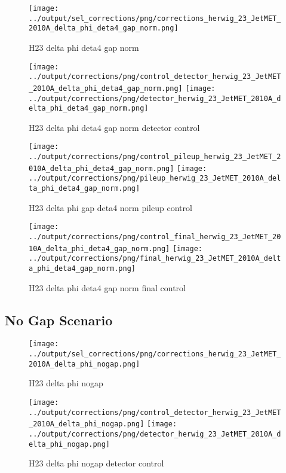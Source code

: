 \documentclass[11pt]{book}
\begin{document}
\begin{figure}[ht]
\centering
\texttt{[image: ../output/sel\_corrections/png/corrections\_herwig\_23\_JetMET\_2010A\_delta\_phi\_deta4\_gap\_norm.png]}
\caption{H23 delta phi deta4 gap norm}
\label{fig:H23_JetMET_2010A_delta_phi_deta4_gap_norm}
\end{figure}


\begin{figure}[ht]
\centering
\texttt{[image: ../output/corrections/png/control\_detector\_herwig\_23\_JetMET\_2010A\_delta\_phi\_deta4\_gap\_norm.png]}
\texttt{[image: ../output/corrections/png/detector\_herwig\_23\_JetMET\_2010A\_delta\_phi\_deta4\_gap\_norm.png]}
\caption{H23 delta phi deta4 gap norm detector control}
\label{fig:H23_JetMET_2010A_delta_phi_deta4_gap_norm_detector_control}
\end{figure}

\begin{figure}[ht]
\centering
\texttt{[image: ../output/corrections/png/control\_pileup\_herwig\_23\_JetMET\_2010A\_delta\_phi\_deta4\_gap\_norm.png]}
\texttt{[image: ../output/corrections/png/pileup\_herwig\_23\_JetMET\_2010A\_delta\_phi\_deta4\_gap\_norm.png]}
\caption{H23 delta phi gap deta4 norm pileup control}
\label{fig:H23_JetMET_2010A_delta_phi_deta4_gap_norm_pileup_control}
\end{figure}


\begin{figure}[ht]
\centering
\texttt{[image: ../output/corrections/png/control\_final\_herwig\_23\_JetMET\_2010A\_delta\_phi\_deta4\_gap\_norm.png]}
\texttt{[image: ../output/corrections/png/final\_herwig\_23\_JetMET\_2010A\_delta\_phi\_deta4\_gap\_norm.png]}
\caption{H23 delta phi deta4 gap norm final control}
\label{fig:H23_JetMET_2010A_delta_phi_deta4_gap_norm_final_control}
\end{figure}

\clearpage
\subsection{No Gap Scenario}
\begin{figure}[ht]
\centering
\texttt{[image: ../output/sel\_corrections/png/corrections\_herwig\_23\_JetMET\_2010A\_delta\_phi\_nogap.png]}
\caption{H23 delta phi nogap}
\label{fig:H23_JetMET_2010A_delta_phi_nogap}
\end{figure}


\begin{figure}[ht]
\centering
\texttt{[image: ../output/corrections/png/control\_detector\_herwig\_23\_JetMET\_2010A\_delta\_phi\_nogap.png]}
\texttt{[image: ../output/corrections/png/detector\_herwig\_23\_JetMET\_2010A\_delta\_phi\_nogap.png]}
\caption{H23 delta phi nogap detector control}
\label{fig:H23_JetMET_2010A_delta_phi_nogap_detector_control}
\end{figure}
\end{document}

